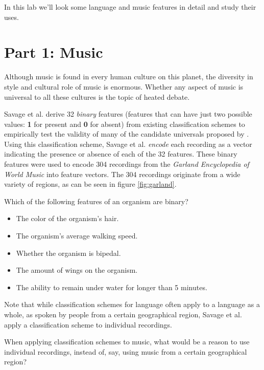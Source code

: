 \documentclass[a4paper, 9pt]{article}
\begin{document}
In this lab we'll look some language and music features in detail and
study their uses.

\section{Part 1: Music}\label{part-1-music}

Although music is found in every human culture on this planet, the
diversity in style and cultural role of music is enormous. Whether any
aspect of music is universal to all these cultures is the topic of
heated debate.

Savage et al. derive 32 \emph{binary} features (features that can have
just two possible values: \textbf{1} for present and
\textbf{0} for absent) from existing classification schemes to
empirically test the validity of many of the candidate universals
proposed by \cite{Brown2013}. Using this classification scheme, Savage
et al. \emph{encode} each recording as a vector indicating the presence
or absence of each of the 32 features. These binary features were used
to encode 304 recordings from the \emph{Garland Encyclopedia of World
Music} into feature vectors. The 304 recordings originate from a wide
variety of regions, as can be seen in figure \ref{fig:garland}.

\begin{exercise}
\askstar Which of the following features of an organism are binary?
\begin{itemize}
\item The color of the organism's hair.
\item The organism's average walking speed.
\item Whether the organism is bipedal.
\item The amount of wings on the organism.
\item The ability to remain under water for longer than 5 minutes.
\end{itemize}
\end{exercise}

Note that while classification schemes for language often apply to a
language as a whole, as spoken by people from a certain geographical
region, Savage et al. apply a classification scheme to individual
recordings.

\begin{exercise}
\askstar When applying classification schemes to music, what would be a reason to use individual recordings, instead of, say, using music from a certain geographical region?
\end{exercise}
\end{document}

